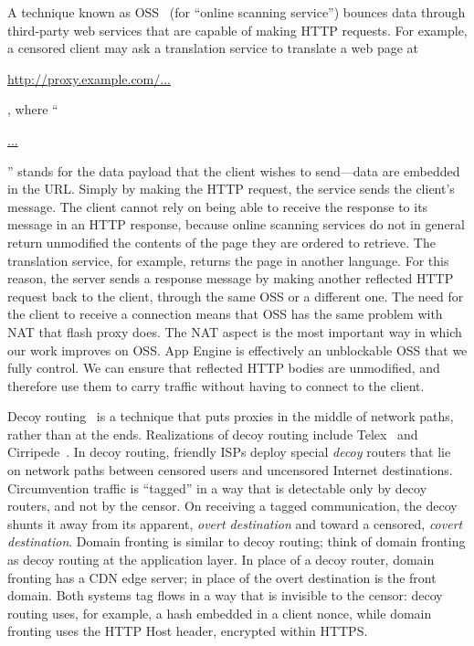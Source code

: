 \documentclass{article}
\begin{document}

A technique known as OSS~\cite{oss} (for
``online scanning service'') bounces data
through third-party web services that are capable of making HTTP requests.
For example, a censored client may ask a translation service to
translate a web page at \begin{NoHyper}\url{http://proxy.example.com/...}\end{NoHyper},
where ``\begin{NoHyper}\url{...}\end{NoHyper}''
stands for the data payload that the client wishes to send---data are embedded in the URL.
Simply by making the HTTP request, the service sends the client's message.
The client cannot rely on being able to receive the response to its message in an HTTP response,
because online scanning services do not in general
return unmodified the contents of the page they are ordered to retrieve.
The translation service, for example, returns the page in another language.
For this reason, the server sends a response message by making
another reflected HTTP request back to the client, through the same OSS or a different one.
The need for the client to receive a connection means that OSS has the same problem with NAT that flash proxy does.
The NAT aspect is the most important way in which our work improves on OSS.
App Engine is effectively an unblockable OSS that we fully control.
We can ensure that reflected HTTP bodies are unmodified, and therefore use them to carry traffic
without having to connect to the client.

Decoy routing~\cite{decoyrouting} is a technique that puts
proxies in the middle of network paths, rather than at the ends.
Realizations of decoy routing include Telex~\cite{telex}
and Cirripede~\cite{cirripede}.
In decoy routing, friendly ISPs deploy special \emph{decoy} routers that lie
on network paths between censored users and uncensored Internet destinations.
Circumvention traffic is ``tagged'' in a way that is detectable only
by decoy routers, and not by the censor.
On receiving a tagged communication, the decoy shunts it away from its apparent, \emph{overt destination}
and toward a censored, \emph{covert destination}.
Domain fronting is similar to decoy routing;
think of domain fronting as decoy routing at the application layer.
In place of a decoy router, domain fronting has a CDN edge server;
in place of the overt destination is the front domain.
Both systems tag flows in a way that is invisible to the censor:
decoy routing uses, for example, a hash embedded in a client nonce,
while domain fronting uses the HTTP Host header, encrypted within HTTPS.
\end{document}

